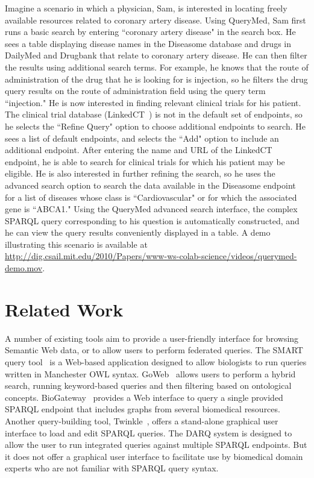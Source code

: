 \documentclass{acm_proc_article-sp}
\begin{document}
Imagine a scenario in which a physician, Sam, is interested in locating freely available resources related to coronary artery disease.  Using QueryMed, Sam first runs a basic search by entering ``coronary artery disease" in the search box. He sees a table displaying disease names in the Diseasome database and drugs in DailyMed and Drugbank that relate to coronary artery disease.  He can then filter the results using additional search terms.  For example, he knows that the route of administration of the drug that he is looking for is injection, so he filters the drug query results on the route of administration field using the query term ``injection."  He is now interested in finding relevant clinical trials for his patient.  The clinical trial database (LinkedCT~\cite{LinkedCT}) is not in the default set of endpoints, so he selects the ``Refine Query" option to choose additional endpoints to search.  He sees a list of default endpoints, and selects the ``Add" option to include an additional endpoint.  After entering the name and URL of the LinkedCT endpoint, he is able to search for clinical trials for which his patient may be eligible.  He is also interested in further refining the search, so he uses the advanced search option to search the data available in the Diseasome endpoint for a list of diseases whose class is ``Cardiovascular" or for which the associated gene is ``ABCA1."  Using the QueryMed advanced search interface, the complex SPARQL query corresponding to his question is automatically constructed, and he can view the query results conveniently displayed in a table. A demo illustrating this scenario is available at \url{http://dig.csail.mit.edu/2010/Papers/www-ws-colab-science/videos/querymed-demo.mov}.



\section{Related Work}
\label{related}

A number of existing tools aim to provide a user-friendly interface for browsing Semantic Web data, or to allow users to perform federated queries. The SMART query tool~\cite{Battista} is a Web-based application designed to allow biologists to run queries written in Manchester OWL syntax. GoWeb~\cite{Dietze} allows users to perform a hybrid search, running keyword-based queries and then filtering based on ontological concepts.  BioGateway~\cite{Antezana} provides a Web interface to query a single provided SPARQL endpoint that includes graphs from several biomedical resources.  Another query-building tool, Twinkle~\cite{Dodds}, offers a stand-alone graphical user interface to load and edit SPARQL queries. The DARQ  system \cite{Quilitz} is designed to allow the user to run integrated queries against multiple SPARQL endpoints. But it does not offer a graphical user interface to facilitate use by biomedical domain experts who are not familiar with SPARQL query syntax.
\end{document}
